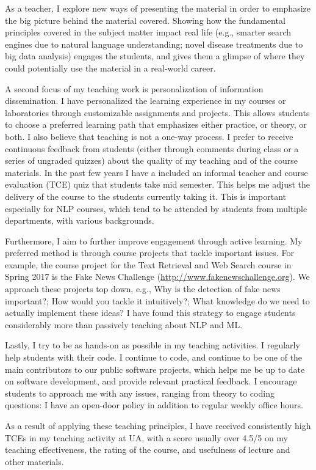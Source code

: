 \documentclass[10pt]{article}
\begin{document}
As a teacher, I explore new ways of presenting the material in order to emphasize the big picture behind the material covered. Showing how the fundamental principles covered in the subject matter impact real life (e.g., smarter search engines due to natural language understanding; novel disease treatments due to big data analysis) engages the students, and gives them a glimpse of where they could potentially use the material in a real-world career.

A second focus of my teaching work is personalization of information dissemination. 
I have personalized the learning experience in my courses or laboratories through customizable assignments and projects. This allows students to choose a preferred learning path that emphasizes either practice, or theory, or both.
I also believe that teaching is not a one-way process. I prefer to receive continuous feedback from students (either through comments during class or a series of ungraded quizzes) about the quality of my teaching and of the course materials. In the past few years I have a included an informal teacher and course evaluation (TCE) quiz that students take mid semester. This helps me adjust the delivery of the course to the students currently taking it. This is important especially for NLP courses, which tend to be attended by students from multiple departments, with various backgrounds. 

Furthermore, I aim to further improve engagement through active learning. My preferred method is through course projects that tackle important issues. For example, the course project for the Text Retrieval and Web Search course in Spring 2017 is the Fake News Challenge (\url{http://www.fakenewschallenge.org}). We approach these projects top down, e.g., Why is the detection of fake news important?; How would you tackle it intuitively?; What knowledge do we need to actually implement these ideas? I have found this strategy to engage students considerably more than passively teaching about NLP and ML. 

Lastly, I try to be as hands-on as possible in my teaching activities. I regularly help students with their code. I continue to code, and continue to be one of the main contributors to our public software projects, which helps me be up to date on software development, and provide relevant practical feedback. I encourage students to approach me with any issues, ranging from theory to coding questions: I have an open-door policy in addition to regular weekly office hours. 


As a result of applying these teaching principles, I have received consistently high TCEs in my teaching activity at UA, with a score usually over 4.5/5 on my teaching effectiveness, the rating of the course, and usefulness of lecture and other materials. 
\end{document}
